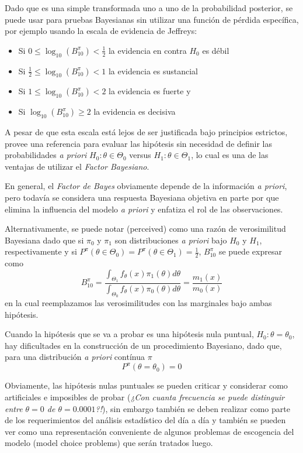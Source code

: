 \documentclass[12pt,]{article}
\providecommand{\tightlist}{%
  \setlength{\itemsep}{0pt}\setlength{\parskip}{0pt}}
\begin{document}
Dado que es una simple transformada uno a uno de la probabilidad
posterior, se puede usar para pruebas Bayesianas sin utilizar una
función de pérdida específica, por ejemplo usando la escala de evidencia
de Jeffreys:

\begin{itemize}
\tightlist
\item
  Si \(0\le\log_{10}(B_{10}^\pi)<\frac{1}{2}\) la evidencia en contra
  \(H_0\) es débil
\item
  Si \(\frac{1}{2}\le\log_{10}(B_{10}^\pi)<1\) la evidencia es
  sustancial
\item
  Si \(1\le\log_{10}(B_{10}^\pi)<2\) la evidencia es fuerte y
\item
  Si \(\log_{10}(B_{10}^\pi)\ge2\) la evidencia es decisiva
\end{itemize}

A pesar de que esta escala está lejos de ser justificada bajo principios
estrictos, provee una referencia para evaluar las hipótesis sin
necesidad de definir las probabilidades \emph{a priori}
\(H_0:\theta\in\Theta_0\) versus \(H_1:\theta\in\Theta_1\), lo cual es
una de las ventajas de utilizar el \emph{Factor Bayesiano}.

En general, el \emph{Factor de Bayes} obviamente depende de la
información \emph{a priori}, pero todavía se considera una respuesta
Bayesiana objetiva en parte por que elimina la influencia del modelo
\emph{a priori} y enfatiza el rol de las observaciones.

Alternativamente, se puede notar (perceived) como una razón de
verosimilitud Bayesiana dado que si \(\pi_0\) y \(\pi_1\) son
distribuciones \emph{a priori} bajo \(H_0\) y \(H_1\), respectivamente y
si \(P^\pi(\theta\in\Theta_0)=P^\pi(\theta\in\Theta_1)=\frac{1}{2}\),
\(B_{10}^\pi\) se puede expresar como \[
B_{10}^\pi=\frac{\displaystyle\int_{\Theta_1}f_\theta(x)\pi_1(\theta)d\theta}{\displaystyle\int_{\Theta_0}f_\theta(x)\pi_0(\theta)d\theta}=\frac{m_1(x)}{m_0(x)}
\] en la cual reemplazamos las verosimilitudes con las marginales bajo
ambas hipótesis.

Cuando la hipótesis que se va a probar es una hipótesis nula puntual,
\(H_0:\theta=\theta_0\), hay dificultades en la construcción de un
procedimiento Bayesiano, dado que, para una distribución \emph{a priori}
contínua \(\pi\) \[
P^\pi(\theta=\theta_0)=0
\]

Obviamente, las hipótesis nulas puntuales se pueden criticar y
considerar como artificiales e imposibles de probar (\emph{¿Con cuanta
frecuencia se puede distinguir entre \(\theta=0\) de
\(\theta=0.0001\)?!}), sin embargo también se deben realizar como parte
de los requerimientos del análisis estadístico del día a día y también
se pueden ver como una representación conveniente de algunos problemas
de escogencia del modelo (model choice problems) que serán tratados
luego.
\end{document}
